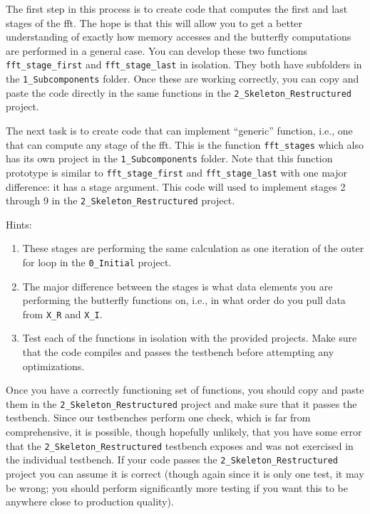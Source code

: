 The first step in this process is to create code that computes the first and last stages of the \gls{fft}. The hope is that this will allow you to get a better understanding of exactly how memory accesses and the butterfly computations are performed in a general case. You can develop these two functions \texttt{fft\_stage\_first} and \texttt{fft\_stage\_last} in isolation. They both have subfolders in the \texttt{1\_Subcomponents} folder. Once these are working correctly, you can copy and paste the code directly in the same functions in the \texttt{2\_Skeleton\_Restructured} project.

The next task is to create code that can implement ``generic'' function, i.e., one that can compute any stage of the \gls{fft}. This is the function \texttt{fft\_stages} which also has its own project in the \texttt{1\_Subcomponents} folder. Note that this function prototype is similar to \texttt{fft\_stage\_first} and \texttt{fft\_stage\_last} with one major difference: it has a stage argument. This code will used to implement stages 2 through 9 in the \texttt{2\_Skeleton\_Restructured} project.

Hints:
\begin{enumerate}
\item These stages are performing the same calculation as one iteration of the outer for loop in the \texttt{0\_Initial} project.
\item The major difference between the stages is what data elements you are performing the butterfly functions on, i.e., in what order do you pull data from \texttt{X\_R} and \texttt{X\_I}.
\item Test each of the functions in isolation with the provided projects. Make sure that the code compiles and passes the testbench before attempting any optimizations.
\end{enumerate}

Once you have a correctly functioning set of functions, you should copy and paste them in the \texttt{2\_Skeleton\_Restructured} project and make sure that it passes the testbench. Since our testbenches perform one check, which is far from comprehensive, it is possible, though hopefully unlikely, that you have some error that the \texttt{2\_Skeleton\_Restructured} testbench exposes and was not exercised in the individual testbench. If your code passes the \texttt{2\_Skeleton\_Restructured} project you can assume it is correct (though again since it is only one test, it may be wrong; you should perform significantly more testing if you want this to be anywhere close to production quality).


